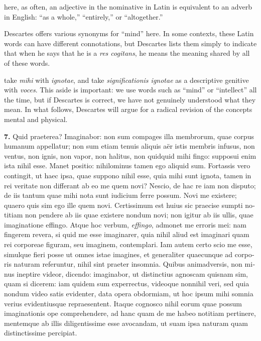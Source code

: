  here, as often, an adjective in the nominative in Latin is equivalent to an adverb in English: ``as a whole,'' ``entirely,'' or ``altogether.''

 Descartes offers various synonyms for ``mind'' here. In some contexts, these Latin words can have different connotations, but Descartes lists them simply to indicate that when he says that he is a \textit{res cogitans}, he means the meaning shared by all of these words.

 take \textit{mihi} with \textit{ignotae}, and take \textit{significationis ignotae} as a descriptive genitive with \textit{voces}. This aside is important: we use words such as ``mind'' or ``intellect'' all the time, but if Descartes is correct, we have not genuinely understood what they mean. In what follows, Descartes will argue for a radical revision of the concepts mental and physical.

\clearpage

\beginnumbering
\pstart
\begin{latin}
    \textenglish{\textbf{7.}} Quid praeterea? Imaginabor: non sum compages illa membrorum, quae corpus humanum appellatur; non sum etiam tenuis aliquis aër istis membris infusus, non ventus, non ignis, non vapor, non halitus, non quidquid mihi fingo: supposui enim ista nihil esse. Manet positio: nihilominus tamen ego aliquid sum. Fortassis vero contingit, ut haec ipsa, quae suppono nihil esse, quia mihi sunt ignota, tamen in rei veritate non differant ab eo me quem novi? Nescio, de hac re iam non disputo; de iis tantum quae mihi nota sunt iudicium ferre possum. Novi me existere; quaero quis sim ego ille quem novi. Certissimum est huius sic praecise sumpti notitiam non pendere ab iis quae existere nondum novi; non igitur ab iis ullis, quae imaginatione effingo. Atque hoc verbum, \textit{effingo}, admonet me erroris mei: nam fingerem revera, si quid me esse imaginarer, quia nihil aliud est imaginari quam rei corporeae figuram, seu imaginem, contemplari. Iam autem certo scio me esse, simulque fieri posse ut omnes istae imagines, et generaliter quaecunque ad corporis naturam referuntur, nihil sint praeter insomnia. Quibus animadversis, non minus ineptire videor, dicendo: imaginabor, ut distinctius agnoscam quisnam sim, quam si dicerem: iam quidem sum experrectus, videoque nonnihil veri, sed quia nondum video satis evidenter, data opera obdormiam, ut hoc ipsum mihi somnia verius evidentiusque repraesentent. Itaque cognosco nihil eorum quae possum imaginationis ope comprehendere, ad hanc quam de me habeo notitiam pertinere, mentemque ab illis diligentissime esse avocandam, ut suam ipsa naturam quam distinctissime percipiat.
\end{latin}
\pend
\endnumbering

